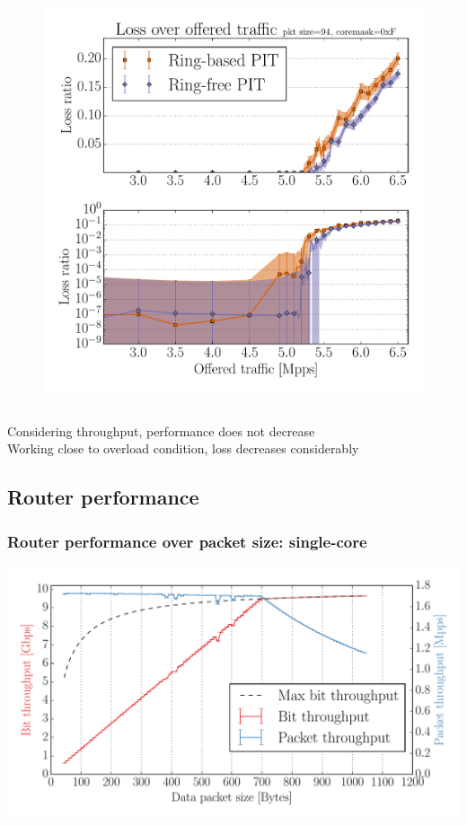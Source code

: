 \begin{frame}[fragile]
\begin{columns}[c]
\begin{figure}
      \includegraphics[width=.85\textwidth]{img/augustus_load_loss.pdf}
    \end{figure}
  \end{columns}

  Considering throughput, performance does not decrease\\
  Working close to overload condition, loss decreases considerably

\end{frame}

\subsection{Router performance}

\begin{frame}[fragile]
  \frametitle{Router performance over packet size: single-core}
  
  \includegraphics[width=\textwidth]{img/augustus_increasing_len_0x1.pdf}
\end{frame}

